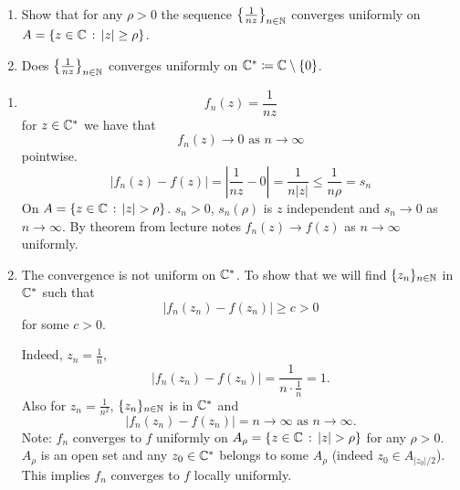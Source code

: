 \documentclass[10pt, a4paper]{article}
\begin{document}
\begin{problem}\phantom{}
    \begin{enumerate}[label = (\roman*)]
        \item Show that for any $\rho > 0$ the sequence $\left\{\frac{1}{nz}\right\}_{n \in \mathbb{N}}$ converges uniformly on $A = \{z \in \mathbb{C}\,:\, |z| \geq \rho\}$.

        \item Does $\left\{\frac{1}{nz}\right\}_{n \in \mathbb{N}}$ converges uniformly on $\mathbb{C} ^ {*} \coloneqq \mathbb{C} \setminus \{0\}$.
    \end{enumerate}

    \begin{solution}
        \begin{enumerate}[label = (\roman*)]
            \item
            \[
            f_n(z) = \frac{1}{nz}
            \]
            for $z \in \mathbb{C} ^ {*}$ we have that
            \[
            f_n(z) \to 0\text{ as } n \to \infty
            \]
            pointwise.
            \[
            |f_n(z) - f(z)| = \left|\frac{1}{nz} - 0\right| = \frac{1}{n|z|} \leq \frac{1}{n\rho} = s_n
            \]
            On $A = \{z \in \mathbb{C}\,:\, |z| > \rho\}$.
            $s_n > 0$,
            $s_n(\rho)$ is $z$ independent and $s_n \to 0$ as $n \to \infty$.
            By theorem from lecture notes $f_n(z) \to f(z)$ as $n \to \infty$ uniformly.

            \item The convergence is not uniform on $\mathbb{C} ^ {*}$.
            To show that we will find $\{z_n\}_{n \in \mathbb{N}}$ in $\mathbb{C} ^ {*}$ such that
            \[
            |f_n(z_n) - f(z_n)| \geq c > 0
            \]
            for some $c > 0$.

            Indeed,
            $z_n = \frac{1}{n}$,
            \[
            |f_n(z_n) - f(z_n)| = \frac{1}{n\cdot\frac{1}{n}} = 1.
            \]
            Also for $z_n = \frac{1}{n ^ 2}$,
            $\{z_n\}_{n \in \mathbb{N}}$ is in $\mathbb{C} ^ {*}$ and
            \[
            |f_n(z_n) - f(z_n)| = n \to \infty\text{ as } n \to \infty.
            \]
            Note:
            $f_n$ converges to $f$ uniformly on $A_{\rho} = \{z \in \mathbb{C}\,:\, |z| > \rho\}$ for any $\rho > 0$.
            $A_{\rho}$ is an open set and any $z_0 \in \mathbb{C} ^ {*}$ belongs to some $A_{\rho}$
            (indeed $z_0 \in A_{|z_0| / 2}$).
            This implies $f_n$ converges to $f$ locally uniformly.
        \end{enumerate}
    \end{solution}
\end{problem}
\end{document}
